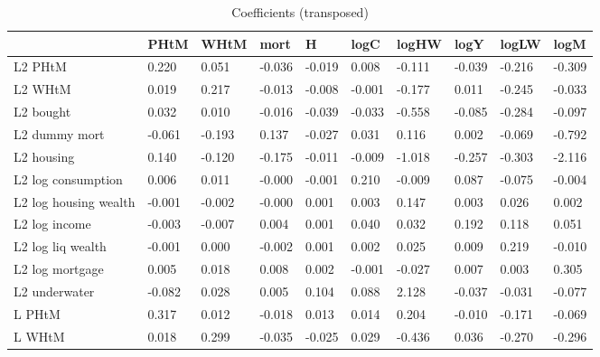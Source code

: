 \begin{table}[htbp]
\caption{\label{clabel} Coefficients (transposed)}\centering\medskip
\begin{tabular}{llllllllll} \hline \hline
 & PHtM  & WHtM  & mort  & H  & logC  & logHW  & logY  & logLW  & logM  \\  \hline 
L2 PHtM &     0.220 &     0.051 &    -0.036 &    -0.019 &     0.008 &    -0.111 &    -0.039 &    -0.216 &    -0.309 \\  
L2 WHtM &     0.019 &     0.217 &    -0.013 &    -0.008 &    -0.001 &    -0.177 &     0.011 &    -0.245 &    -0.033 \\  
L2 bought &     0.032 &     0.010 &    -0.016 &    -0.039 &    -0.033 &    -0.558 &    -0.085 &    -0.284 &    -0.097 \\  
L2 dummy mort &    -0.061 &    -0.193 &     0.137 &    -0.027 &     0.031 &     0.116 &     0.002 &    -0.069 &    -0.792 \\  
L2 housing &     0.140 &    -0.120 &    -0.175 &    -0.011 &    -0.009 &    -1.018 &    -0.257 &    -0.303 &    -2.116 \\  
L2 log consumption &     0.006 &     0.011 &    -0.000 &    -0.001 &     0.210 &    -0.009 &     0.087 &    -0.075 &    -0.004 \\  
L2 log housing wealth &    -0.001 &    -0.002 &    -0.000 &     0.001 &     0.003 &     0.147 &     0.003 &     0.026 &     0.002 \\  
L2 log income &    -0.003 &    -0.007 &     0.004 &     0.001 &     0.040 &     0.032 &     0.192 &     0.118 &     0.051 \\  
L2 log liq wealth &    -0.001 &     0.000 &    -0.002 &     0.001 &     0.002 &     0.025 &     0.009 &     0.219 &    -0.010 \\  
L2 log mortgage &     0.005 &     0.018 &     0.008 &     0.002 &    -0.001 &    -0.027 &     0.007 &     0.003 &     0.305 \\  
L2 underwater &    -0.082 &     0.028 &     0.005 &     0.104 &     0.088 &     2.128 &    -0.037 &    -0.031 &    -0.077 \\  
L PHtM &     0.317 &     0.012 &    -0.018 &     0.013 &     0.014 &     0.204 &    -0.010 &    -0.171 &    -0.069 \\  
L WHtM &     0.018 &     0.299 &    -0.035 &    -0.025 &     0.029 &    -0.436 &     0.036 &    -0.270 &    -0.296 \\  

\end{tabular}
\end{table}
